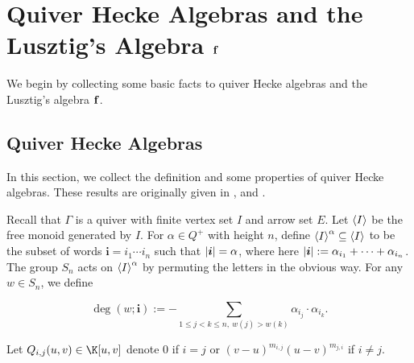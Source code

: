 \chapter{Quiver Hecke Algebras and the Lusztig's Algebra $\mathbf{f}$}

We begin by collecting some basic facts to quiver Hecke algebras
and the Lusztig's algebra $\mathbf{f}$.

\section{Quiver Hecke Algebras}

In this section, we collect the definition and some properties of quiver Hecke algebras.
These results are originally given in \cite{KL1}, \cite{KL2} and \cite{R}.

Recall that $\Gamma$ is a quiver with finite vertex set $I$ and arrow set $E$.
Let $\left<I\right>$ be the free monoid generated by $I$. 
For $\alpha\in Q^+$ with height $n$,
define $\left<I\right>^\alpha \subseteq \left<I\right>$ to be the subset of words
$\boldsymbol{i} = i_1\cdots i_n$ such that $\left|\boldsymbol{i}\right| = \alpha$,
where here $\left|\boldsymbol{i}\right| :=  \alpha_{i_1}+ \cdots+ \alpha_{i_n}$.
The group $S_n$ acts on $\left<I\right>^\alpha$ by permuting the letters
in the obvious way. For any $w\in S_n$, we define 

\begin{equation}
    \label{deg-w-i}\deg(w;\boldsymbol{i}) := -\sum_{1\le j<k\le n,\ w(j)>w(k)}
    \alpha_{i_j}\cdot\alpha_{i_k}.
\end{equation}

Let $Q_{i,j}(u,v)\in \K[u,v]$
denote $0$ if $i = j$ or $(v-u)^{m_{i,j}}(u-v)^{m_{j,i}}$ if $i\ne j$.

